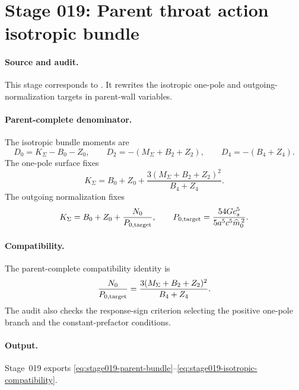 \section[Stage 019]{Stage 019: Parent throat action isotropic bundle}
\label{stage:019}


\paragraph{Source and audit.}
This stage corresponds to
.
It rewrites the isotropic one-pole and outgoing-normalization targets in
parent-wall variables.

\paragraph{Parent-complete denominator.}
The isotropic bundle moments are
\begin{equation}
\label{eq:stage019-parent-bundle}
D_0=K_\Sigma-B_0-Z_0,\qquad
D_2=-(M_\Sigma+B_2+Z_2),\qquad
D_4=-(B_4+Z_4).
\end{equation}
The one-pole surface fixes
\begin{equation}
\label{eq:stage019-one-pole-parent}
K_\Sigma=B_0+Z_0+
\frac{3(M_\Sigma+B_2+Z_2)^2}{B_4+Z_4}.
\end{equation}
The outgoing normalization fixes
\begin{equation}
\label{eq:stage019-normalization-parent}
K_\Sigma=B_0+Z_0+\frac{N_0}{P_{0,\rm target}},
\qquad
P_{0,\rm target}=\frac{54Gc_s^5}{5a^5c^5\widehat m_0^{\,2}}.
\end{equation}

\paragraph{Compatibility.}
The parent-complete compatibility identity is
\begin{equation}
\label{eq:stage019-isotropic-compatibility}
\frac{N_0}{P_{0,\rm target}}
=\frac{3(M_\Sigma+B_2+Z_2)^2}{B_4+Z_4}.
\end{equation}
The audit also checks the response-sign criterion selecting the positive
one-pole branch and the constant-prefactor conditions.

\paragraph{Output.}
Stage~019 exports \eqref{eq:stage019-parent-bundle}--\eqref{eq:stage019-isotropic-compatibility}.
